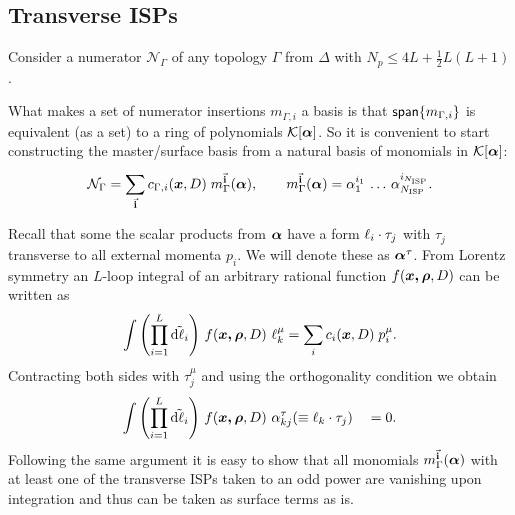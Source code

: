 \subsection{Transverse ISPs}
\label{sec:traceless_completion}

Consider a numerator $\mathcal{N}_\Gamma$ of any topology $\Gamma$ from $\Delta$ with $N_p \leq  4L + \frac{1}{2}L(L+1)$.

What makes a set of numerator insertions $m_{\Gamma,i}$ a basis is that
$\mathsf{span}\{m_{\Gamma,i}\}$ is equivalent (as a set) to a ring of polynomials $\mathcal{K}[\vb*{\alpha}]$.
So it is convenient to start constructing the master/surface basis from a natural basis of monomials in $\mathcal{K}[\vb*{\alpha}]$:
\begin{equation}
  \mathcal{N}_\Gamma = \sum_{\va{i}}^{} c_{\Gamma, i}(\vb*{x},D) \; m_\Gamma^{\va{i}}(\vb*{\alpha}), \qquad
  m_\Gamma^{\va{i}}(\vb*{\alpha}) =
  \alpha_1^{i_1}\,\ldots{}\,\alpha_{N_\text{ISP} }^{i_{N_\text{ISP} }}.
\end{equation}




Recall that some the scalar products from $\vb*{\alpha}$ have a form $\sp(\ell_i,\tau_j)$ with $\tau_j$ transverse to all external momenta $p_i$.
We will denote these as $\vb*{\alpha}^\tau$.
From Lorentz symmetry an $L$-loop integral of an arbitrary rational function $f(\vb*{\vb*{x},\vb*{\rho}},D)$ can be written as
\begin{equation} \label{eq:rank_1_tensor_integral}
  \int \qty(\prod_{i=1}^{L} \tilde{\dd{\ell_i}}){}~ f(\vb*{\vb*{x},\vb*{\rho}},D) ~ \ell_k^{\mu} = \sum_{i}^{}c_i(\vb*{x},D)\;p^\mu_i.
\end{equation}
Contracting both sides with $\tau^\mu_j$ and using the orthogonality condition we obtain
\begin{equation}
  \Dmeasure{}~ f(\vb*{\vb*{x},\vb*{\rho}},D) ~ \alpha^{\tau}_{k j}( \equiv \sp(\ell_k,\tau_j)) \quad = 0.
\end{equation}
Following the same argument it is easy to show that all monomials $m_\Gamma^{\va{i}}(\vb*{\alpha})$ with at least
one of the transverse ISPs taken to an odd power are vanishing upon integration and thus can be taken as surface terms as is.

